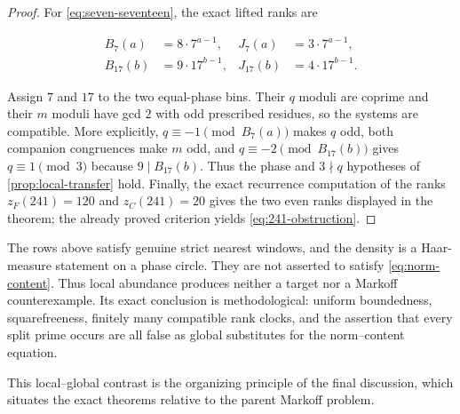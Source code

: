 \begin{proof}
For \cref{eq:seven-seventeen}, the exact lifted ranks are

\begin{equation}
\begin{aligned}
 B_7(a)&=8\mathbin{\cdot}7^{a-1},
 &J_7(a)&=3\mathbin{\cdot}7^{a-1},\\
 B_{17}(b)&=9\mathbin{\cdot}17^{b-1},
 &J_{17}(b)&=4\mathbin{\cdot}17^{b-1}.
\end{aligned}
\end{equation}

Assign $7$ and $17$ to the two equal-phase bins. Their $q$ moduli are
coprime and their $m$ moduli have gcd $2$ with odd prescribed residues, so
the systems are compatible. More explicitly,
$q\equiv-1\pmod {B_7(a)}$ makes $q$ odd, both companion congruences make
$m$ odd, and $q\equiv-2\pmod {B_{17}(b)}$ gives
$q\equiv1\pmod3$ because $9\mid B_{17}(b)$. Thus the phase and
$3\nmid q$ hypotheses of \cref{prop:local-transfer} hold. Finally, the
exact recurrence computation of the ranks $z_F(241)=120$ and $z_C(241)=20$
gives the two even ranks displayed in the theorem; the already proved criterion yields
\cref{eq:241-obstruction}.
\end{proof}

\begin{remark}
\label{rem:local-scope}
The rows above satisfy genuine strict nearest windows, and the density is a
Haar-measure statement on a phase circle. They are not asserted to satisfy
\cref{eq:norm-content}. Thus local abundance produces neither a target nor a
Markoff counterexample. Its exact conclusion is methodological: uniform
boundedness, squarefreeness, finitely many compatible rank clocks, and the
assertion that every split prime occurs are all false as global substitutes
for the norm--content equation.
\end{remark}

This local--global contrast is the organizing principle of the final
discussion, which situates the exact theorems relative to the parent Markoff
problem.
